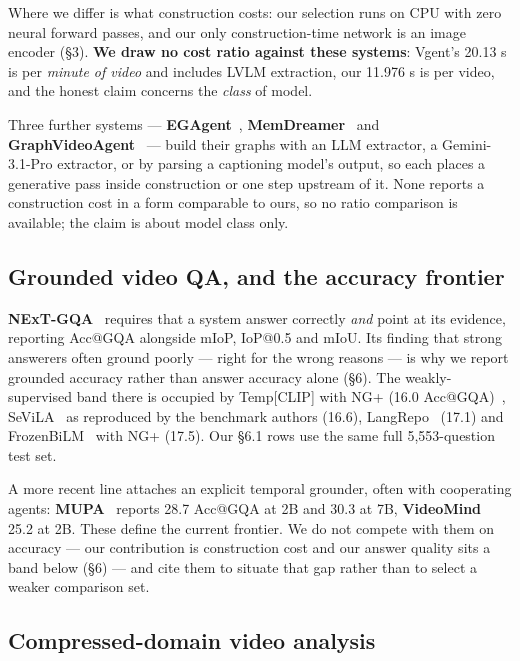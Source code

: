 \documentclass[sigconf,review,anonymous]{acmart}
\begin{document}
Where we differ is what construction costs: our selection runs on CPU with zero neural forward
passes, and our only construction-time network is an image encoder (§3). \textbf{We draw no cost
ratio against these systems}: Vgent's 20.13 s is per \emph{minute of video} and includes LVLM
extraction, our 11.976 s is per video, and the honest claim concerns the \emph{class} of model.

Three further systems --- \textbf{EGAgent}~\cite{rege2026egagent}, \textbf{MemDreamer}~\cite{chen2026memdreamer}
and \textbf{GraphVideoAgent}~\cite{chu2025graphvideoagent} --- build their graphs with an LLM extractor,
a Gemini-3.1-Pro extractor, or by parsing a captioning model's output, so each places a
generative pass inside construction or one step upstream of it. None reports a
construction cost in a form comparable to ours, so no ratio comparison is available; the claim is about model
class only.

\subsection{Grounded video QA, and the accuracy frontier}

\textbf{NExT-GQA}~\cite{xiao2024nextgqa} requires that a system answer correctly \emph{and} point at its
evidence, reporting Acc@GQA alongside mIoP, IoP@0.5 and mIoU. Its finding that strong
answerers often ground poorly --- right for the wrong reasons --- is why we report grounded
accuracy rather than answer accuracy alone (§6). The weakly-supervised band there is occupied
by Temp{[}CLIP{]} with NG+ (16.0 Acc@GQA)~\cite{xiao2024nextgqa}, SeViLA~\cite{yu2023sevila} as reproduced by the benchmark authors (16.6),
LangRepo~\cite{kahatapitiya2024langrepo} (17.1) and FrozenBiLM~\cite{yang2022frozenbilm} with NG+ (17.5). Our §6.1 rows use the same full
5,553-question test set.

A more recent line attaches an explicit temporal grounder, often with cooperating agents:
\textbf{MUPA}~\cite{dang2025mupa} reports 28.7 Acc@GQA at 2B and 30.3 at 7B, \textbf{VideoMind}~\cite{liu2025videomind} 25.2 at 2B. These define
the current frontier. We do not compete with them on accuracy --- our contribution is
construction cost and our answer quality sits a band below (§6) --- and cite them to situate
that gap rather than to select a weaker comparison set.

\subsection{Compressed-domain video analysis}
\end{document}
